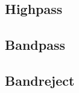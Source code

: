 \documentclass[american, twoside]{article}
\begin{document}
\subsection{Highpass} \label{Butterworth:Highpass}

\subsection{Bandpass} \label{Butterworth:Bandpass}
\subsection{Bandreject} \label{Butterworth:Bandreject}

\newpage
\printbibliography[heading=bibintoc]
\end{document}
